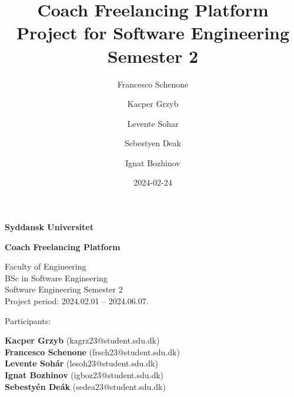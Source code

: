 \title{Coach Freelancing Platform Project for Software Engineering Semester 2}
\author{Francesco Schenone \and Kacper Grzyb \and Levente Sohar \and Sebestyen Deak \and Ignat Bozhinov}
\date{2024-02-24}
\begin{titlepage}
\centering
\vspace*{1cm}

\Huge
\textbf{Syddansk Universitet}

\vspace{2cm}

\Huge
\textbf{Coach Freelancing Platform}\\

\vfill

\large
Faculty of Engineering\\
BSc in Software Engineering\\
Software Engineering Semester 2 \\
Project period: 2024.02.01 -- 2024.06.07.

\vfill
\begin{flushleft}
    Participants: \\
\end{flushleft}

    \hfill \small{\textbf{Kacper Grzyb} (kagrz23@student.sdu.dk)} \\
    \hfill \small{\textbf{Francesco Schenone} (frsch23@student.sdu.dk)} \\
    \hfill \small{\textbf{Levente Sohár} (lesoh23@student.sdu.dk)} \\
    \hfill \small{\textbf{Ignat Bozhinov} (igboz23@student.sdu.dk)} \\
    \hfill \small{\textbf{Sebestyén Deák} (sedea23@student.sdu.dk)} \\

\end{titlepage}
